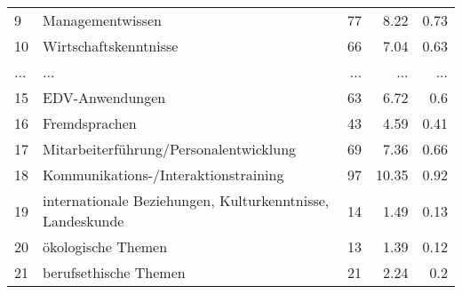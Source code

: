 \begin{longtable}{lXrrr}
        9 & \multicolumn{1}{X}{Managementwissen} & %
          \num{77} &
          \num[round-mode=places,round-precision=2]{8.22} &
          \num[round-mode=places,round-precision=2]{0.73} \\
        10 & \multicolumn{1}{X}{Wirtschaftskenntnisse} & %
          \num{66} &
          \num[round-mode=places,round-precision=2]{7.04} &
          \num[round-mode=places,round-precision=2]{0.63} \\
       ... & ... & ... & ... & ... \\
        15 & \multicolumn{1}{X}{EDV-Anwendungen} & %
          \num{63} &
          \num[round-mode=places,round-precision=2]{6.72} &
          \num[round-mode=places,round-precision=2]{0.6} \\

        16 & \multicolumn{1}{X}{Fremdsprachen} & %
          \num{43} &
          \num[round-mode=places,round-precision=2]{4.59} &
          \num[round-mode=places,round-precision=2]{0.41} \\

        17 & \multicolumn{1}{X}{Mitarbeiterführung/Personalentwicklung} & %
          \num{69} &
          \num[round-mode=places,round-precision=2]{7.36} &
          \num[round-mode=places,round-precision=2]{0.66} \\

        18 & \multicolumn{1}{X}{Kommunikations-/Interaktionstraining} & %
          \num{97} &
          \num[round-mode=places,round-precision=2]{10.35} &
          \num[round-mode=places,round-precision=2]{0.92} \\

        19 & \multicolumn{1}{X}{internationale Beziehungen, Kulturkenntnisse, Landeskunde} & %
          \num{14} &
          \num[round-mode=places,round-precision=2]{1.49} &
          \num[round-mode=places,round-precision=2]{0.13} \\

        20 & \multicolumn{1}{X}{ökologische Themen} & %
          \num{13} &
          \num[round-mode=places,round-precision=2]{1.39} &
          \num[round-mode=places,round-precision=2]{0.12} \\

        21 & \multicolumn{1}{X}{berufsethische Themen} & %
          \num{21} &
          \num[round-mode=places,round-precision=2]{2.24} &
          \num[round-mode=places,round-precision=2]{0.2} \\


\end{longtable}
